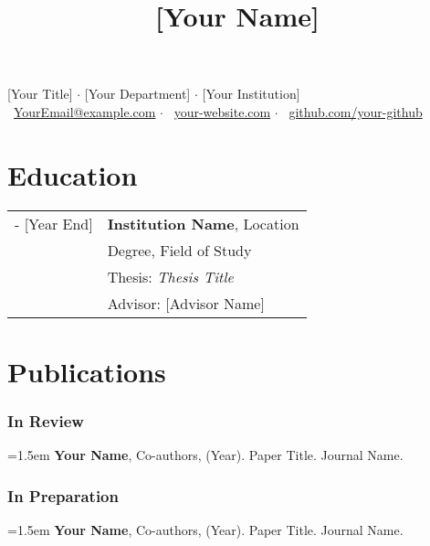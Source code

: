 \documentclass[a4paper,10pt]{article}
\begin{document}
\title{\LARGE\bfseries [Your Name]}
\author{}
\date{}

\maketitle \vspace{-2.0cm} %

\begin{center}
    [Your Title] $\cdot$ [Your Department] $\cdot$ [Your Institution] \\
    
    \faEnvelope\ \href{mailto:YourEmail@example.com}{YourEmail@example.com} $\cdot$ 
    \faGlobe\ \href{https://your-website.com}{your-website.com} $\cdot$ 
    \faGithub\ \href{https://github.com/your-github}{github.com/your-github} %
\end{center}

\thispagestyle{firstpagefooter}

\section*{Education}
\begin{tabularx}{\textwidth}{>{\raggedright\arraybackslash}p{2.5cm} X}
[Year Start] - [Year End] & \textbf{Institution Name}, Location \\
               & Degree, Field of Study \\
               & Thesis: \textit{Thesis Title} \\
               & Advisor: [Advisor Name] \\
\end{tabularx}

\section*{Publications}

\subsubsection*{In Review} 
\hangindent=1.5em 
\textbf{Your Name}, Co-authors, (Year). Paper Title. Journal Name.

\subsubsection*{In Preparation}
\hangindent=1.5em 
\textbf{Your Name}, Co-authors, (Year). Paper Title. Journal Name. 
\end{document}
